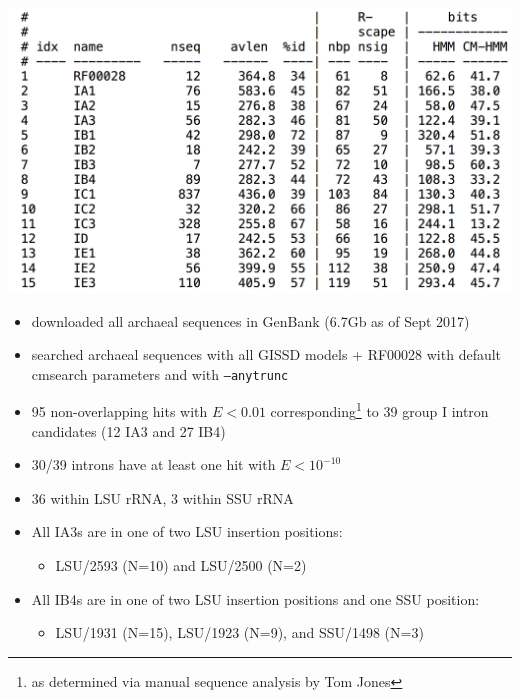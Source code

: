 \documentclass[custom,landscape,final,30pt,plainboxedsections]{sciposter-titleskipsmall}
\begin{document}
\begin{multicols}{3}
\begin{center}
\includegraphics[width=13.5in]{figs/GISSD-stats-zoomed}
\end{center}

\begin{itemize}
\item downloaded all archaeal sequences in GenBank (6.7Gb as of Sept
  2017)
\item searched archaeal sequences with all GISSD models + RF00028 with
  default cmsearch parameters and with \texttt{--anytrunc}
\item 95 non-overlapping hits with $E < 0.01$
  corresponding\footnote{as determined via manual sequence analysis by Tom Jones} to 39
  group I intron candidates (12 IA3 and 27 IB4)
\item 30/39 introns have at least one hit with $E < 10^{-10}$ 
\item 36 within LSU rRNA, 3 within SSU rRNA
\item All IA3s are in one of two LSU insertion positions:
  \begin{itemize}
  \item LSU/2593 (N=10) and LSU/2500 (N=2)
  \end{itemize}
\item All IB4s are in one of two LSU insertion positions and one SSU
  position:
  \begin{itemize}
  \item LSU/1931 (N=15), LSU/1923 (N=9), and SSU/1498 (N=3)
  \end{itemize}  
\end{itemize}  



\end{multicols}
\end{document}
